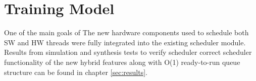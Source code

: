 \section{Training Model} \label{sec:build3} One of the main goals of
The new hardware components used to schedule both SW and HW threads were fully
integrated into the existing scheduler module.  Results from simulation and
synthesis tests to verify scheduler correct scheduler functionality of the new
hybrid features along with O(1) ready-to-run queue structure can be found in
chapter \ref{sec:results}.

